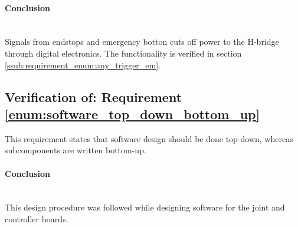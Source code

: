 \paragraph{Conclusion}~\\
Signals from endstops and emergency botton cuts off power to the H-bridge through digital electronics.
The functionality is verified in section \ref{ssub:requirement_enum:any_trigger_em}.

\subsection{Verification of: Requirement \ref{enum:software_top_down_bottom_up}} %
\label{sub:verification_of_requirement_enum:software_top_down_bottom_up}
This requirement states that software design should be done top-down, whereas subcomponents are written bottom-up.

\paragraph{Conclusion}~\\
This design procedure was followed while designing software for the joint and controller boards.